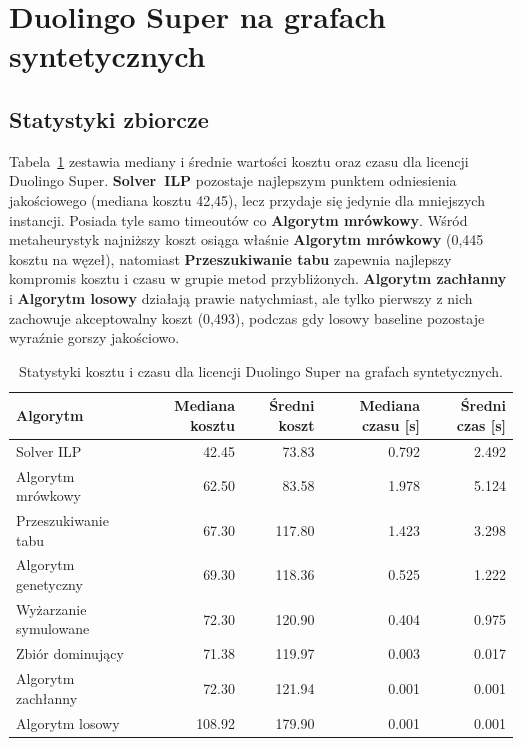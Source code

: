 \section{Duolingo Super na grafach syntetycznych}

\subsection{Statystyki zbiorcze}

Tabela~\ref{tab:duo-synth-summary} zestawia mediany i średnie wartości kosztu oraz czasu dla licencji Duolingo Super. \textbf{Solver~ILP} pozostaje najlepszym punktem odniesienia jakościowego (mediana kosztu 42,45), lecz przydaje się jedynie dla mniejszych instancji. Posiada tyle samo timeoutów co \textbf{Algorytm mrówkowy}. Wśród metaheurystyk najniższy koszt osiąga właśnie \textbf{Algorytm mrówkowy} (0,445 kosztu na węzeł), natomiast \textbf{Przeszukiwanie tabu} zapewnia najlepszy kompromis kosztu i czasu w grupie metod przybliżonych. \textbf{Algorytm zachłanny} i \textbf{Algorytm losowy} działają prawie natychmiast, ale tylko pierwszy z nich zachowuje akceptowalny koszt (0,493), podczas gdy losowy baseline pozostaje wyraźnie gorszy jakościowo.

\begin{table}[H]
  \centering
  \caption{Statystyki kosztu i czasu dla licencji Duolingo Super na grafach syntetycznych.}
  \label{tab:duo-synth-summary}
  \begin{tabular}{lrrrr}
    \toprule
    \textbf{Algorytm}     & \textbf{Mediana kosztu} & \textbf{Średni koszt} & \textbf{Mediana czasu [s]} & \textbf{Średni czas [s]} \\
    \midrule
    Solver ILP            & 42.45                   & 73.83                 & 0.792                      & 2.492                    \\
    Algorytm mrówkowy     & 62.50                   & 83.58                 & 1.978                      & 5.124                    \\
    Przeszukiwanie tabu   & 67.30                   & 117.80                & 1.423                      & 3.298                    \\
    Algorytm genetyczny   & 69.30                   & 118.36                & 0.525                      & 1.222                    \\
    Wyżarzanie symulowane & 72.30                   & 120.90                & 0.404                      & 0.975                    \\
    Zbiór dominujący      & 71.38                   & 119.97                & 0.003                      & 0.017                    \\
    Algorytm zachłanny    & 72.30                   & 121.94                & 0.001                      & 0.001                    \\
    Algorytm losowy       & 108.92                  & 179.90                & 0.001                      & 0.001                    \\
    \bottomrule
  \end{tabular}
\end{table}



